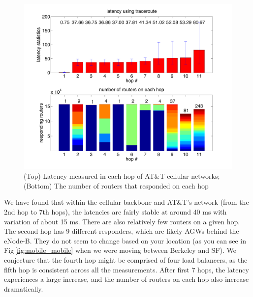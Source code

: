 \begin{figure}[!tbh]
  \centering
  \includegraphics[width=\linewidth]{../figs/mobile_latency.pdf}
  \vspace{-1em}
  \caption{(Top) Latency measured in each hop of AT\&T cellular networks; (Bottom) The number of routers that responded on each hop}
  \label{fig:mobile_latency}
\end{figure}

We have found that within the cellular backbone and AT\&T's network (from the 2nd hop to 7th hops), the latencies are fairly stable at around 40 ms with variation of about 15 ms. There are also relatively few routers on a given hop. The second hop has 9 different responders, which are likely AGWs behind the eNode-B. They do not seem to change based on your location (as you can see in Fig\,\ref{fig:mobile_mobile} when we were moving between Berkeley and SF). We conjecture that the fourth hop might be comprised of four load balancers, as the fifth hop is consistent across all the measurements. After first 7 hops, the latency experiences a large increase, and the number of routers on each hop also increase dramatically.

